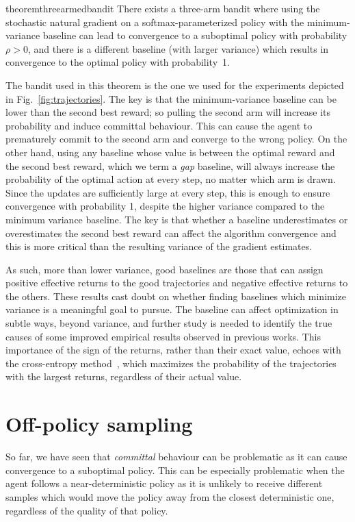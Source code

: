 \begin{restatable}[]{theorem}{threearmedbandit}
There exists a three-arm bandit where using the stochastic natural gradient on a softmax-parameterized policy with the minimum-variance baseline can lead to convergence to a suboptimal policy with probability $\rho > 0$, and there is a different baseline (with larger variance) which results in convergence to the optimal policy with probability~1.
\label{proposition_threearmedbandit}
\end{restatable}
The bandit used in this theorem is the one we used for the experiments depicted in Fig.~\ref{fig:trajectories}.
The key is that the minimum-variance baseline can be lower than the second best reward; so pulling the second arm will increase its probability and induce committal behaviour.
This can cause the agent to prematurely commit to the second arm and converge to the wrong policy.
On the other hand, using any baseline whose value is between the optimal reward and the second best reward, which we term a \textit{gap} baseline, will always increase the probability of the optimal action at every step, no matter which arm is drawn. Since the updates are sufficiently large at every step, this is enough to ensure convergence with probability 1, despite the higher variance compared to the minimum variance baseline.
The key is that whether a baseline underestimates or overestimates the second best reward can affect the algorithm convergence and this is more critical than the resulting variance of the gradient estimates.


As such, more than lower variance, good baselines are those that can assign positive effective returns to the good trajectories and negative effective returns to the others. These results cast doubt on whether finding baselines which minimize variance is a meaningful goal to pursue. The baseline can affect optimization in subtle ways, beyond variance, and further study is needed to identify the true causes of some improved empirical results observed in previous works. This importance of the sign of the returns, rather than their exact value, echoes with the cross-entropy method~\citep{de2005tutorial}, which maximizes the probability of the trajectories with the largest returns, regardless of their actual value.


\section{Off-policy sampling} 

So far, we have seen that \textit{committal} behaviour can be problematic as it can cause convergence to a suboptimal policy. This can be especially problematic when the agent follows a near-deterministic policy as it is unlikely to receive different samples which would move the policy away from the closest deterministic one, regardless of the quality of that policy.

